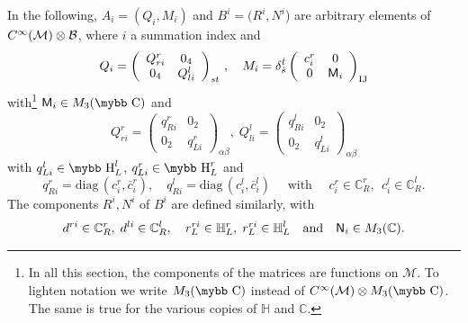 \documentclass[11pt]{article}
\newcommand{\sM}{\mathsf M}
\newcommand{\sN}{\mathsf N}
\newcommand{\cinf}{{C^\infty({\cal M})}}
\newcommand{\M}{\mathcal M}
\def\bb#1{\hbox{\mybb#1}}
\newcommand{\sI}{\mathrm  I}
\newcommand{\sJ}{\mathrm J}
\begin{document}
In the following, 
$A_i=(Q_i,M_i)$ and $B^i=(R^i, N^i$)  are arbitrary elements of $\cinf\otimes\cal
B$, where $i$ a summation index and 
\begin{equation}
Q_i = \left(\begin{array}{cc} Q_{ri}^{r}& 0_4 \\ 0_4 &
    Q_{li}^{l}\end{array}\right)_{st}\,,\quad  M_i = \delta_{\dot s}^{\dot t} \left(\begin{array}{cc} c_{i}^r & 0
      \\ 0 & {\bf \sM}_i\end{array}\right)_{\sI\sJ} 
\end{equation}
with{\footnote{In all this section, the components of the matrices are
  functions on $\M$. To lighten notation we write $M_3(\bb C)$ instead
  of $\cinf\otimes M_3(\bb C)$. The same is true for the various
  copies of $\mathbb H$ and $\mathbb C$.}} ${\bf \sM}_i \in M_3(\bb C)$ and
\begin{equation} 
   Q_{ri}^{r}=\left(
     \begin{array}{cc}
       q^r_{Ri}& 0_2 \\
       0_2 & q^r_{Li}
     \end{array}
  \right)_{\alpha\beta}, \; Q^{l}_{li}=\left(
     \begin{array}{cc}
       q^l_{Ri}& 0_2 \\
       0_2 & q^l_{Li}
     \end{array}
  \right)_{\alpha\beta} 
\label{eq:6}
\end{equation}
with $q_{Li}^l\in \bb H_L^l$, $q_{Li}^r\in \bb H_L^r $ and
\begin{equation}
q_{Ri}^r =\text{diag}\,(c_{i}^r,\bar c_{i}^r), \quad q_{Ri}^l =\text
{diag}\,(c_{i}^l,\bar c_{i}^l) \quad\text{ with }\quad c_i^r\in \mathbb C_R^r,\;\,
c_i^l \in \mathbb C_R^l.
\label{eq:9}
\end{equation}
The components $R^i, N^i$ of $B^i$ are defined similarly, with 
\begin{equation}
d^{ri}\in \mathbb C_R^r,\; d^{li}\in\mathbb C_R^l,\quad
 r_L^{ri}\in\mathbb H_{L}^r , \;  r_L^{ri}\in\mathbb
 H_{L}^l\quad\text{and}\quad
{\bf{\sN}}_i\in M_3(\mathbb C).
\label{eq:11}
\end{equation}
\end{document}

